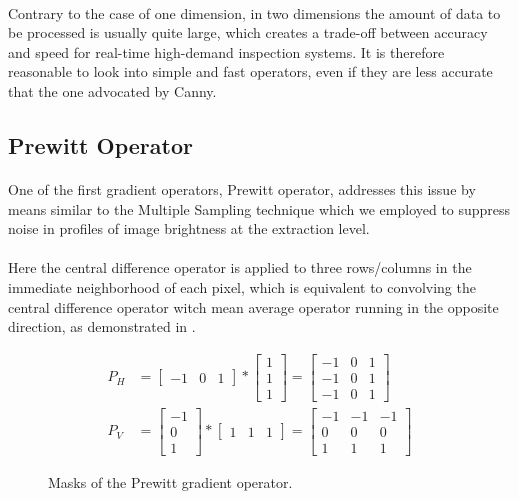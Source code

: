 \paragraph*{}
Contrary to the case of one dimension, in two dimensions the amount of data to be processed is usually quite large, which creates a trade-off between accuracy and speed for real-time high-demand inspection systems. It is therefore reasonable to look into simple and fast operators, even if they are less accurate that the one advocated by Canny.

\subsection{Prewitt Operator}

\paragraph*{}
One of the first gradient operators, Prewitt operator, addresses this issue by means similar to the Multiple Sampling technique which we employed to suppress noise in profiles of image brightness at the extraction level. 

\paragraph*{}
Here the central difference operator is applied to three rows/columns in the immediate neighborhood of each pixel, which is equivalent to convolving the central difference operator witch mean average operator running in the opposite direction, as demonstrated in .

\begin{figure}[h!]
\begin{align*}
P_{H} &= \begin{bmatrix}
	-1 & 0 & 1 
	\end{bmatrix}
	*
	\begin{bmatrix}
	1 \\
	1 \\
	1
	\end{bmatrix}
	= 
	\begin{bmatrix}
	-1 & 0 & 1 \\
	-1 & 0 & 1 \\
	-1 & 0 & 1
	\end{bmatrix} \\
P_{V} &= 
	\begin{bmatrix}
	-1 \\
	0 \\
	1 
	\end{bmatrix}
	*
	\begin{bmatrix}
	1 & 1 & 1
	\end{bmatrix}
	= 
	\begin{bmatrix}
	-1 & -1 & -1 \\
	0 & 0 & 0 \\
	1 & 1 & 1
	\end{bmatrix}
\end{align*}
\caption{Masks of the Prewitt gradient operator.}
\label{fig:PrewittMasks}
\end{figure}

